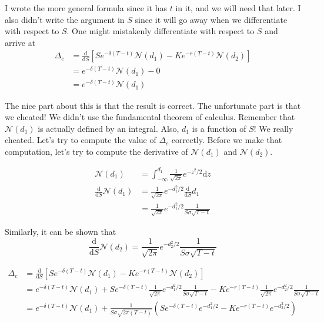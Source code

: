 \documentclass{ximera}
\begin{document}
I wrote the more general formula since it has $t$ in it, and we will need that later. I also didn't write the argument in $S$ since it will go away when we differentiate with respect to $S$. One might mistakenly differentiate with respect to $S$ and arrive at
\begin{align*}
\Delta_c 	&=\frac{\mathrm{d}}{\mathrm{d}S}\left[Se^{-\delta (T-t)}\mathcal{N}(d_1)-Ke^{-r(T-t)}\mathcal{N}(d_2)\right]\\
		&=e^{-\delta(T-t)}\mathcal{N}(d_1)-0\\
		&=e^{-\delta(T-t)}\mathcal{N}(d_1)
\end{align*}

The nice part about this is that the result is correct. The unfortunate part is that we cheated! We didn't use the fundamental theorem of calculus. Remember that $\mathcal{N}(d_1)$ is actually defined by an integral. Also, $d_1$ is a function of $S$! We really cheated. Let's try to compute the value of $\Delta_c$ correctly. Before we make that computation, let's try to compute the derivative of $\mathcal{N}(d_1)$ and $\mathcal{N}(d_2)$.

\begin{align*}
\mathcal{N}(d_1) 						&=\int_{-\infty}^{d_1}\frac{1}{\sqrt{2\pi}}e^{-z^2/2}\mathrm{d}z\\
\frac{\mathrm{d}}{\mathrm{d}S}\mathcal{N}(d_1)	&=\frac{1}{\sqrt{2\pi}}e^{-d_1^2/2}\frac{\mathrm{d}}{\mathrm{d}S}d_1\\
								&=\frac{1}{\sqrt{2\pi}}e^{-d_1^2/2}\frac{1}{S\sigma\sqrt{T-t}}
\end{align*}

Similarly, it can be shown that
\begin{equation*}
\frac{\mathrm{d}}{\mathrm{d}S}\mathcal{N}(d_2) 	=\frac{1}{\sqrt{2\pi}}e^{-d_2^2/2}\frac{1}{S\sigma\sqrt{T-t}}
\end{equation*}

\begin{align*}
\Delta_c 	&=\frac{\mathrm{d}}{\mathrm{d}S}\left[Se^{-\delta (T-t)}\mathcal{N}(d_1)-Ke^{-r(T-t)}\mathcal{N}(d_2)\right]\\
		&=e^{-\delta(T-t)}\mathcal{N}(d_1)+Se^{-\delta(T-t)}\frac{1}{\sqrt{2\pi}}e^{-d_1^2/2}\frac{1}{S\sigma\sqrt{T-t}}-Ke^{-r(T-t)}\frac{1}{\sqrt{2\pi}}e^{-d_2^2/2}\frac{1}{S\sigma\sqrt{T-t}}\\
		&=e^{-\delta(T-t)}\mathcal{N}(d_1)+\frac{1}{S\sigma\sqrt{2\pi(T-t)}}\left(Se^{-\delta(T-t)}e^{-d_1^2/2}-Ke^{-r(T-t)}e^{-d_2^2/2}\right)
\end{align*}
\end{document}
